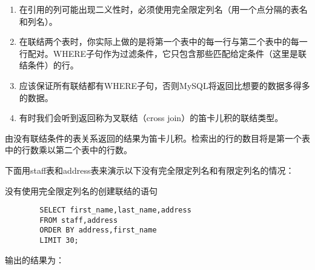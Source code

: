 \documentclass[UTF8]{article}
\begin{document}
\begin{orangebox}[frametitle={Tips 15.2.1 、注意完全限定列名}]
        \begin{enumerate}
                \item 在引用的列可能出现二义性时，必须使用完全限定列名（用一个点分隔的表名和列名）。
                \item 在联结两个表时，你实际上做的是将第一个表中的每一行与第二个表中的每一行配对。WHERE子句作为过滤条件，它只包含那些匹配给定条件（这里是联结条件）的行。
                \item 应该保证所有联结都有WHERE子句，否则MySQL将返回比想要的数据多得多的数据。
                \item 有时我们会听到返回称为叉联结（cross join）的笛卡儿积的联结类型。
        \end{enumerate}
\end{orangebox}        
        
\begin{redbox}[frametitle={Defination 15.2.1 笛卡儿积（cartesian product）}]
        由没有联结条件的表关系返回的结果为笛卡儿积。检索出的行的数目将是第一个表中的行数乘以第二个表中的行数。
\end{redbox}

下面用staff表和address表来演示以下没有完全限定列名和有限定列名的情况：
\begin{listing}[H]
        \caption{没有使用完全限定列名的创建联结的语句}
	\label{code:faultcartesiancreatejoinclause}
\begin{verbatim}
        SELECT first_name,last_name,address 
        FROM staff,address 
        ORDER BY address,first_name 
        LIMIT 30;
\end{verbatim}
\end{listing}

输出的结果为：
\end{document}
